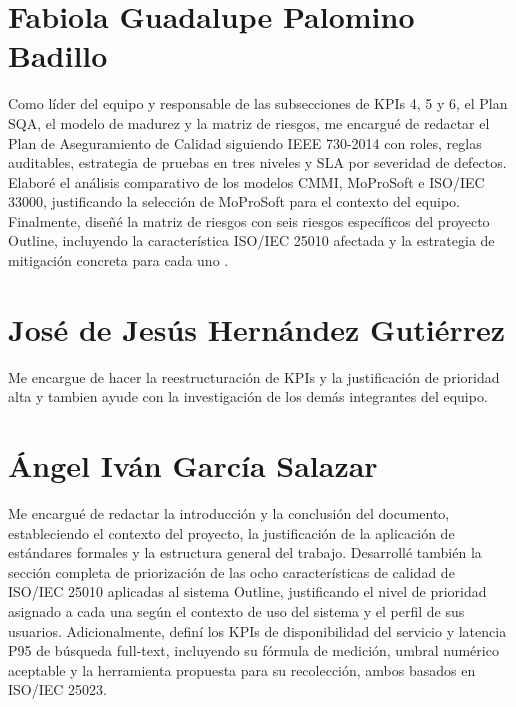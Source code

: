 \documentclass{report}
\begin{document}
\section*{Fabiola Guadalupe Palomino Badillo}

Como líder del equipo y responsable de las subsecciones de KPIs 4, 5 y 6, el Plan SQA, el modelo de madurez y la matriz de riesgos, me encargué de redactar el Plan de Aseguramiento de Calidad siguiendo IEEE 730-2014 con roles, reglas auditables, estrategia de pruebas en tres niveles y SLA por severidad de defectos. Elaboré el análisis comparativo de los modelos CMMI, MoProSoft e ISO/IEC 33000, justificando la selección de MoProSoft para el contexto del equipo. Finalmente, diseñé la matriz de riesgos con seis riesgos específicos del proyecto Outline, incluyendo la característica ISO/IEC 25010 afectada y la estrategia de mitigación concreta para cada uno \cite{pressman2020, iso25010_2023}.

\section*{José de Jesús Hernández Gutiérrez}

Me encargue de hacer la reestructuración de KPIs y la justificación de prioridad alta y tambien ayude con la investigación de los demás integrantes del equipo.


\section*{Ángel Iván García Salazar}
Me encargué de redactar la introducción y la conclusión del documento, 
estableciendo el contexto del proyecto, la justificación de la aplicación 
de estándares formales y la estructura general del trabajo. Desarrollé 
también la sección completa de priorización de las ocho características 
de calidad de ISO/IEC 25010 aplicadas al sistema Outline, justificando 
el nivel de prioridad asignado a cada una según el contexto de uso del 
sistema y el perfil de sus usuarios. Adicionalmente, definí los KPIs de 
disponibilidad del servicio y latencia P95 de búsqueda full-text, 
incluyendo su fórmula de medición, umbral numérico aceptable y la 
herramienta propuesta para su recolección, ambos basados en 
ISO/IEC 25023.
\end{document}
